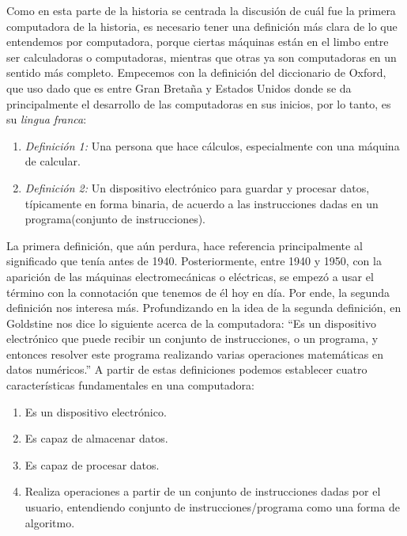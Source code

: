 \documentclass[letterpaper,12pt,oneside]{book}
\begin{document}
		Como en esta parte de la historia se centrada la discusión de cuál fue la primera computadora de la historia, es necesario tener una definición
		más clara de lo que entendemos por computadora, porque ciertas máquinas están en el limbo entre ser calculadoras o computadoras, mientras que otras ya son computadoras en un sentido más completo. Empecemos con la definición 
		del diccionario de Oxford, que uso dado que es entre Gran Bretaña y Estados Unidos donde se da principalmente el desarrollo de las computadoras
		en sus inicios, por lo tanto, es su \textit{lingua franca}:
		\begin{enumerate}
			  \item[] \emph{ Definición 1:} Una persona que hace cálculos, especialmente con una máquina de calcular.
			  \item[] \emph{ Definición 2:} Un dispositivo electrónico para guardar y procesar datos, típicamente en forma binaria, de acuerdo a las instrucciones
			  dadas en un programa(conjunto de instrucciones).
		\end{enumerate}
		
		La primera definición, que aún perdura, hace referencia principalmente al significado que tenía antes de 1940. Posteriormente, entre 1940 y 1950,
		con la aparición de las máquinas electromecánicas o eléctricas, se empezó a usar el término con la connotación que tenemos de él hoy en día. Por ende,
		la segunda definición nos interesa más.  Profundizando en la idea de la segunda definición, en \cite{goldstine_computer_1972} Goldstine nos dice lo siguiente 
		acerca de la computadora: ``Es un dispositivo electrónico que puede recibir un conjunto de instrucciones, o un programa,
		y entonces resolver este programa realizando varias operaciones matemáticas en datos numéricos.'' A partir de estas definiciones podemos establecer
		cuatro características fundamentales en una computadora:
		
		\begin{enumerate}
			\item Es un dispositivo electrónico. 
			\item Es capaz de almacenar datos.
			\item Es capaz de procesar datos.
			\item Realiza operaciones a partir de un conjunto de instrucciones dadas por el usuario, entendiendo conjunto de instrucciones/programa como una forma de algoritmo.
		\end{enumerate}
		
\end{document}

